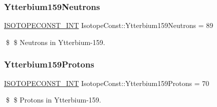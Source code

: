 \subsubsection{\texorpdfstring{Ytterbium159\+Neutrons}{Ytterbium159Neutrons}}
{\footnotesize\ttfamily \mbox{\hyperlink{group___isotope_const-_macros_ga5f18360b3e99483a35c32d789e62621c}{I\+S\+O\+T\+O\+P\+E\+C\+O\+N\+S\+T\+\_\+\+I\+NT}} Isotope\+Const\+::\+Ytterbium159\+Neutrons = 89}

\$ \$ Neutrons in Ytterbium-\/159. \mbox{\label{group___isotope_const-_ytterbium-_yb159_ga24cffa800d54f11c3714c310dae27468}} 
\subsubsection{\texorpdfstring{Ytterbium159\+Protons}{Ytterbium159Protons}}
{\footnotesize\ttfamily \mbox{\hyperlink{group___isotope_const-_macros_ga5f18360b3e99483a35c32d789e62621c}{I\+S\+O\+T\+O\+P\+E\+C\+O\+N\+S\+T\+\_\+\+I\+NT}} Isotope\+Const\+::\+Ytterbium159\+Protons = 70}

\$ \$ Protons in Ytterbium-\/159. 